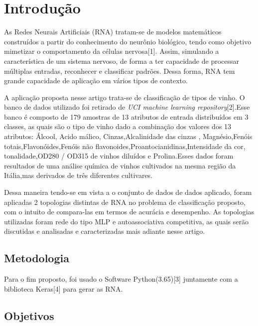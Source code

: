 
\section{Introdução}
As Redes Neurais Artificiais (RNA) tratam-se de modelos matemáticos construídos a partir do conhecimento do neurônio biológico, tendo como objetivo mimetizar o comportamento da células nervosa[1]. Assim, simulando a característica de um sistema nervoso, de forma a ter capacidade de processar múltiplas entradas, reconhecer e classificar padrões. Dessa forma, RNA tem grande capacidade de aplicação em vários tipos de contexto.

A aplicação proposta nesse artigo trata-se de classificação de tipos de vinho. O banco de dados utilizado foi retirado de \textit{UCI machine learning repository}[2].Esse banco é composto de 179 amostras de 13 atributos de entrada distribuídos em 3 classes, as quais são o tipo de vinho dado a combinação dos valores dos 13  atributos: Álcool, Acido málico, Cinzas,Alcalinidade das cinzas , Magnésio,Fenóis totais,Flavonóides,Fenóis não flavonoides,Proantocianidinas,Intensidade da cor, tonalidade,OD280 / OD315 de vinhos diluídos e Prolina.Esses dados foram resultados de uma análise química de vinhos cultivados na mesma região da Itália,mas derivados de três diferentes cultivares.

Dessa maneira tendo-se em vista a o conjunto de dados de dados aplicado, foram aplicadas 2 topologias distintas de RNA no problema de classificação proposto, com o intuito de compara-las em termos de acurácia e desempenho. As topologias utilizadas foram rede do tipo MLP e autoassociativa competitiva, as quais serão discutidas e analisadas e caracterizadas mais adiante nesse artigo.


\subsection{Metodologia}

Para o fim proposto, foi usado o Software Python(3.65)[3] juntamente com a biblioteca Keras[4] para gerar as RNA.


\subsection{Objetivos}

